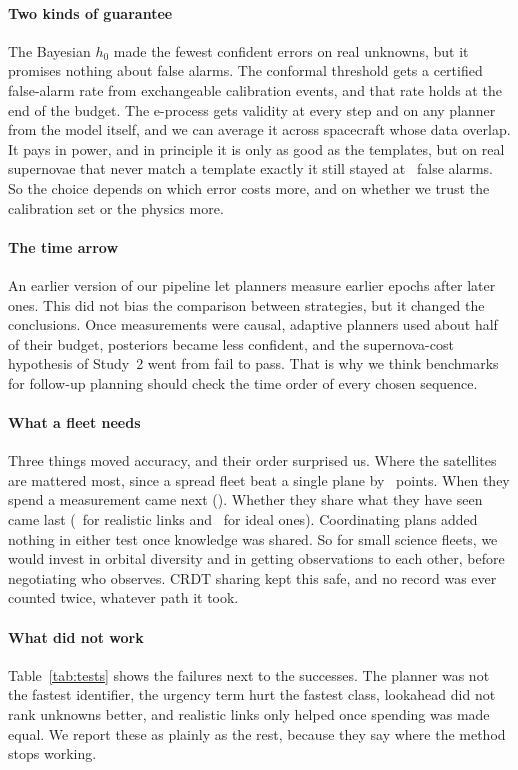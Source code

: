 \documentclass[final,5p,times,twocolumn,authoryear]{elsarticle}
\begin{document}
\paragraph{Two kinds of guarantee} The Bayesian $h_0$ made the fewest confident errors on real unknowns, but it promises nothing about false alarms. The conformal threshold gets a certified false-alarm rate from exchangeable calibration events, and that rate holds at the end of the budget. The e-process gets validity at every step and on any planner from the model itself, and we can average it across spacecraft whose data overlap. It pays in power, and in principle it is only as good as the templates, but on real supernovae that never match a template exactly it still stayed at \EFreshFa\ false alarms. So the choice depends on which error costs more, and on whether we trust the calibration set or the physics more.

\paragraph{The time arrow} An earlier version of our pipeline let planners measure earlier epochs after later ones. This did not bias the comparison between strategies, but it changed the conclusions. Once measurements were causal, adaptive planners used about half of their budget, posteriors became less confident, and the supernova-cost hypothesis of Study~2 went from fail to pass. That is why we think benchmarks for follow-up planning should check the time order of every chosen sequence.

\paragraph{What a fleet needs} Three things moved accuracy, and their order surprised us. Where the satellites are mattered most, since a spread fleet beat a single plane by \FleetBFourEst\ points. When they spend a measurement came next (\FleetBThreeEst). Whether they share what they have seen came last (\FleetBOneEst\ for realistic links and \FleetHFourOneEst\ for ideal ones). Coordinating plans added nothing in either test once knowledge was shared. So for small science fleets, we would invest in orbital diversity and in getting observations to each other, before negotiating who observes. CRDT sharing kept this safe, and no record was ever counted twice, whatever path it took.

\paragraph{What did not work} Table~\ref{tab:tests} shows the failures next to the successes. The planner was not the fastest identifier, the urgency term hurt the fastest class, lookahead did not rank unknowns better, and realistic links only helped once spending was made equal. We report these as plainly as the rest, because they say where the method stops working.
\end{document}

